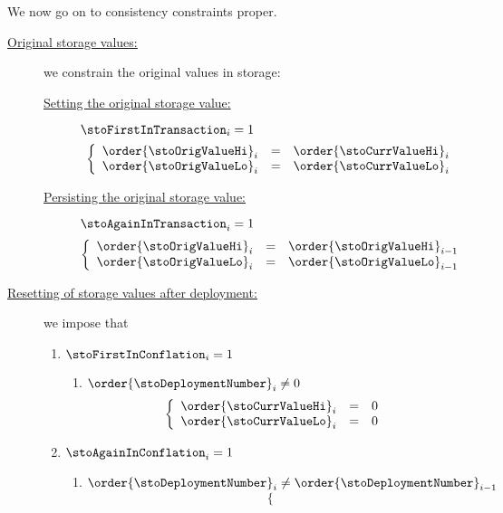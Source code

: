 We now go on to consistency constraints proper.
\begin{description}
	\item[\underline{\underline{Original storage values:}}]
		we constrain the original values in storage:
		\begin{description}
			\item[\underline{Setting the original storage value:}]
				\If $\stoFirstInTransaction _{i} = 1$ \Then
				\[
					\left\{ \begin{array}{lcl}
						\order{\stoOrigValueHi}_{i} & = & \order{\stoCurrValueHi}_{i} \\
						\order{\stoOrigValueLo}_{i} & = & \order{\stoCurrValueLo}_{i} \\
					\end{array} \right.
				\]
			\item[\underline{Persisting the original storage value:}]
				\If $\stoAgainInTransaction _{i} = 1$ \Then
				\[
					\left\{ \begin{array}{lcl}
						\order{\stoOrigValueHi}_{i} & = & \order{\stoOrigValueHi}_{i - 1} \\
						\order{\stoOrigValueLo}_{i} & = & \order{\stoOrigValueLo}_{i - 1} \\
					\end{array} \right.
				\]
		\end{description}
	\item[\underline{\underline{Resetting of storage values after deployment:}}]
		we impose that
		\begin{enumerate}
			\item
				\If $\stoFirstInConflation _{i} = 1$ \Then
				\begin{enumerate}
					\item \If $\order{\stoDeploymentNumber}_{i} \neq 0$ \Then
						\[
							\left\{ \begin{array}{lcl}
								\order{\stoCurrValueHi}_{i} & = & 0 \\
								\order{\stoCurrValueLo}_{i} & = & 0 \\
							\end{array} \right.
						\]
				\end{enumerate}
			\item
				\If $\stoAgainInConflation _{i} = 1$ \Then
				\begin{enumerate}
					\item \If $\order{\stoDeploymentNumber}_{i} \neq \order{\stoDeploymentNumber}_{i - 1}$ \Then
						\[
							\left\{ \begin{array}{lcl}

\end{array}\]
\end{enumerate}
\end{enumerate}
\end{description}
